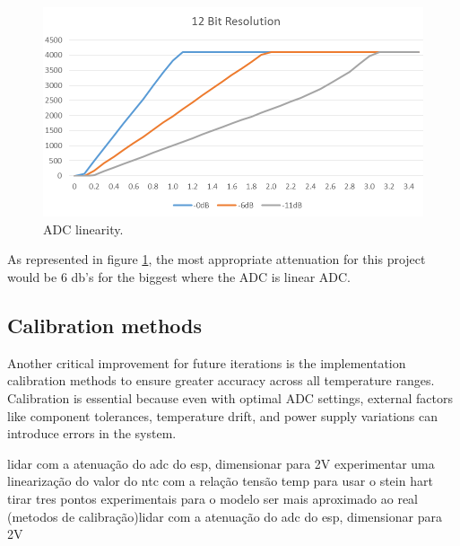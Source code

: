 \documentclass[12pt]{article}
\begin{document}
\begin{figure}[H] 
    \centering
    \includegraphics*[scale = 0.4]{images/ADC-linearity-test-at-12-bit-resolution.png}
    \caption{ADC linearity\cite{ESP32_microcontroller}.}
    \label{fig:ADClinear}
\end{figure}

As represented in figure \ref{fig:ADClinear}, the most appropriate attenuation for this project would be 6 db's for the biggest where the ADC is linear ADC.

\subsection{ Calibration methods }

Another critical improvement for future iterations is the implementation calibration methods to ensure greater accuracy across all temperature ranges. Calibration is essential because even with optimal ADC settings, external factors like component tolerances, temperature drift, and power supply variations can introduce errors in the system.


lidar com a atenuação do adc do esp, dimensionar para 2V
experimentar uma linearização do valor do ntc com a relação tensão temp
para usar o stein hart tirar tres pontos experimentais para o modelo ser mais aproximado ao real 
(metodos de calibração)lidar com a atenuação do adc do esp, dimensionar para 2V

\newpage

\end{document}
